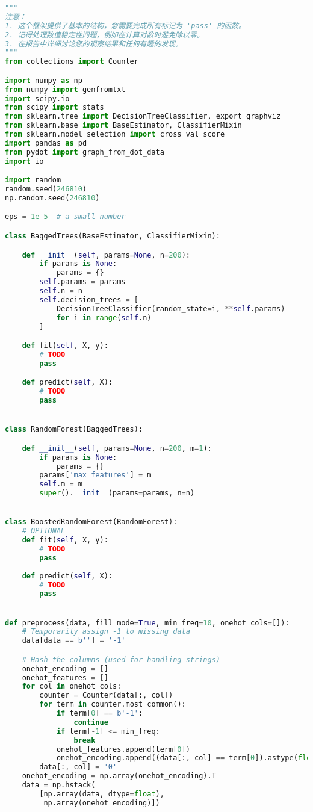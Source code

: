 \documentclass[8pt]{article}
\begin{document}
\begin{lstlisting}[language=Python, caption=随机森林模型接口]
"""
注意：
1. 这个框架提供了基本的结构，您需要完成所有标记为 'pass' 的函数。
2. 记得处理数值稳定性问题，例如在计算对数时避免除以零。
3. 在报告中详细讨论您的观察结果和任何有趣的发现。
"""
from collections import Counter

import numpy as np
from numpy import genfromtxt
import scipy.io
from scipy import stats
from sklearn.tree import DecisionTreeClassifier, export_graphviz
from sklearn.base import BaseEstimator, ClassifierMixin
from sklearn.model_selection import cross_val_score
import pandas as pd
from pydot import graph_from_dot_data
import io

import random
random.seed(246810)
np.random.seed(246810)

eps = 1e-5  # a small number

class BaggedTrees(BaseEstimator, ClassifierMixin):

    def __init__(self, params=None, n=200):
        if params is None:
            params = {}
        self.params = params
        self.n = n
        self.decision_trees = [
            DecisionTreeClassifier(random_state=i, **self.params)
            for i in range(self.n)
        ]

    def fit(self, X, y):
        # TODO
        pass

    def predict(self, X):
        # TODO
        pass


class RandomForest(BaggedTrees):

    def __init__(self, params=None, n=200, m=1):
        if params is None:
            params = {}
        params['max_features'] = m
        self.m = m
        super().__init__(params=params, n=n)


class BoostedRandomForest(RandomForest):
    # OPTIONAL
    def fit(self, X, y):
        # TODO
        pass
    
    def predict(self, X):
        # TODO
        pass


def preprocess(data, fill_mode=True, min_freq=10, onehot_cols=[]):
    # Temporarily assign -1 to missing data
    data[data == b''] = '-1'

    # Hash the columns (used for handling strings)
    onehot_encoding = []
    onehot_features = []
    for col in onehot_cols:
        counter = Counter(data[:, col])
        for term in counter.most_common():
            if term[0] == b'-1':
                continue
            if term[-1] <= min_freq:
                break
            onehot_features.append(term[0])
            onehot_encoding.append((data[:, col] == term[0]).astype(float))
        data[:, col] = '0'
    onehot_encoding = np.array(onehot_encoding).T
    data = np.hstack(
        [np.array(data, dtype=float),
         np.array(onehot_encoding)])


\end{lstlisting}
\end{document}
